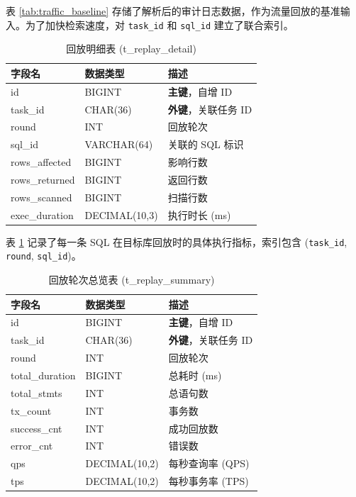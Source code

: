 表 \ref{tab:traffic_baseline} 存储了解析后的审计日志数据，作为流量回放的基准输入。为了加快检索速度，对 \texttt{task\_id} 和 \texttt{sql\_id} 建立了联合索引。

\begin{table}[htbp]
    \centering
    \caption{回放明细表 (t\_replay\_detail)}
    \label{tab:replay_detail}
    \begin{tabular}{l l p{6cm}}
        \toprule
        \textbf{字段名} & \textbf{数据类型} & \textbf{描述} \\
        \midrule
        id & BIGINT & \textbf{主键}，自增 ID \\
        task\_id & CHAR(36) & \textbf{外键}，关联任务 ID \\
        round & INT & 回放轮次 \\
        sql\_id & VARCHAR(64) & 关联的 SQL 标识 \\
        rows\_affected & BIGINT & 影响行数 \\
        rows\_returned & BIGINT & 返回行数 \\
        rows\_scanned & BIGINT & 扫描行数 \\
        exec\_duration & DECIMAL(10,3) & 执行时长 (ms) \\
        \bottomrule
    \end{tabular}
\end{table}

表 \ref{tab:replay_detail} 记录了每一条 SQL 在目标库回放时的具体执行指标，索引包含 (\texttt{task\_id}, \texttt{round}, \texttt{sql\_id})。

\begin{table}[htbp]
    \centering
    \caption{回放轮次总览表 (t\_replay\_summary)}
    \label{tab:replay_summary}
    \begin{tabular}{l l p{6cm}}
        \toprule
        \textbf{字段名} & \textbf{数据类型} & \textbf{描述} \\
        \midrule
        id & BIGINT & \textbf{主键}，自增 ID \\
        task\_id & CHAR(36) & \textbf{外键}，关联任务 ID \\
        round & INT & 回放轮次 \\
        total\_duration & BIGINT & 总耗时 (ms) \\
        total\_stmts & INT & 总语句数 \\
        tx\_count & INT & 事务数 \\
        success\_cnt & INT & 成功回放数 \\
        error\_cnt & INT & 错误数 \\
        qps & DECIMAL(10,2) & 每秒查询率 (QPS) \\
        tps & DECIMAL(10,2) & 每秒事务率 (TPS) \\
        \bottomrule
    \end{tabular}
\end{table}

